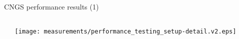 \documentclass[compress,red]{beamer}
\begin{document}
\begin{frame}{CNGS performance results (1)}
\begin{columns}[c]
\begin{center}

	  \end{center}
		\begin{center}
		\texttt{[image: measurements/performance\_testing\_setup-detail.v2.eps]}
		
		
		\end{center}
  \end{columns}


\end{frame}
\end{document}
